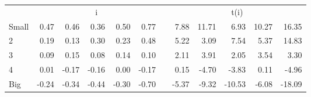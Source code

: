 \begin{table}[!ht]
\begin{tabular}{lrrrrrlrrrrr}
  
    
      & \multicolumn{5}{c}{i} & & \multicolumn{5}{c}{t(i)}
    
    \\
      \cmidrule(r){2-6} \cmidrule(r){8-12}

    Small   & 0.47  & 0.46  & 0.36  & 0.50  & 0.77 & & 7.88  & 11.71  & 6.93  & 10.27  & 16.35  \\
         2  & 0.19  & 0.13  & 0.30  & 0.23  & 0.48 & & 5.22  & 3.09  & 7.54  & 5.37  & 14.83  \\
         3  & 0.09  & 0.15  & 0.08  & 0.14  & 0.10 & & 2.11  & 3.91  & 2.05  & 3.54  & 3.30  \\
         4  & 0.01  & -0.17  & -0.16  & 0.00  & -0.17 & & 0.15  & -4.70  & -3.83  & 0.11  & -4.96  \\
    Big     & -0.24  & -0.34  & -0.44  & -0.30  & -0.70 & & -5.37  & -9.32  & -10.53  & -6.08  & -18.09  \\



  \bottomrule
\end{tabular}
\label{tbl:25_Size_Inv}
\end{table}